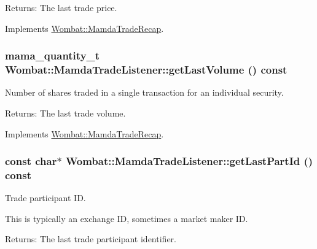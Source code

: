 \begin{Desc}
\item[Returns:]The last trade price. \end{Desc}


Implements \hyperlink{classWombat_1_1MamdaTradeRecap_24a18014e43ec6df41a6405e3b2e0b03}{Wombat::Mamda\-Trade\-Recap}.\hypertarget{classWombat_1_1MamdaTradeListener_d8de6f0f0a88393c9f57d9627570ee96}{
\subsubsection[getLastVolume]{\setlength{\rightskip}{0pt plus 5cm}mama\_\-quantity\_\-t Wombat::Mamda\-Trade\-Listener::get\-Last\-Volume () const}}
\label{classWombat_1_1MamdaTradeListener_d8de6f0f0a88393c9f57d9627570ee96}


Number of shares traded in a single transaction for an individual security. 

\begin{Desc}
\item[Returns:]The last trade volume. \end{Desc}


Implements \hyperlink{classWombat_1_1MamdaTradeRecap_095f2490ee5cb36624d26e34bf01547b}{Wombat::Mamda\-Trade\-Recap}.\hypertarget{classWombat_1_1MamdaTradeListener_2e1bdae3c8609e4b8fe5709c0ea5c0f2}{
\subsubsection[getLastPartId]{\setlength{\rightskip}{0pt plus 5cm}const char$\ast$ Wombat::Mamda\-Trade\-Listener::get\-Last\-Part\-Id () const}}
\label{classWombat_1_1MamdaTradeListener_2e1bdae3c8609e4b8fe5709c0ea5c0f2}


Trade participant ID. 

This is typically an exchange ID, sometimes a market maker ID.

\begin{Desc}
\item[Returns:]The last trade participant identifier. \end{Desc}


